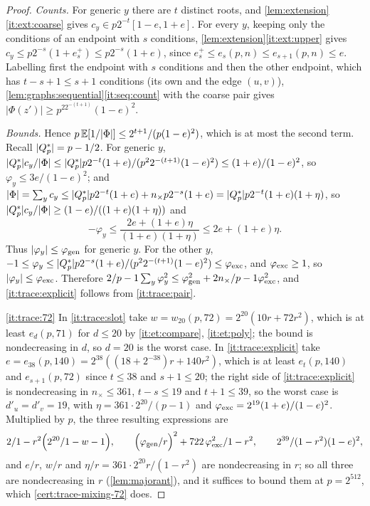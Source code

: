 \begin{proof}
\emph{Counts.} For generic $y$ there are $t$ distinct roots, and
\cref{lem:extension}\ref{it:ext:coarse} gives $c_y\in p2^{-t}[1-e,1+e]$. For every
$y$, keeping only the conditions of an endpoint with $s$ conditions,
\cref{lem:extension}\ref{it:ext:upper} gives $c_y\le p2^{-s}(1+e^+_s)\le p2^{-s}(1+e)$,
since $e^+_s\le e_s(p,n)\le e_{s+1}(p,n)\le e$. Labelling first the endpoint
with $s$ conditions and then the other endpoint, which has $t-s+1\le s+1$
conditions (its own and the edge $(u,v)$),
\cref{lem:graphs:sequential}\ref{it:seq:count} with the coarse pair gives
$|\Phi(z')|\ge p^22^{-(t+1)}(1-e)^2$.

\emph{Bounds.} Hence $p\,\E[1/|\Phi|]\le2^{t+1}/(p(1-e)^2)$, which is at most the
second term. Recall $|\Qsq|=\frac{p-1}2$. For generic $y$,
$|\Qsq|c_y/|\Phi|\le|\Qsq|p2^{-t}(1+e)/(p^22^{-(t+1)}(1-e)^2)\le(1+e)/(1-e)^2$, so
$\varphi_y\le3e/(1-e)^2$; and
$|\Phi|=\sum_yc_y\le|\Qsq|p2^{-t}(1+e)+n_\times p2^{-s}(1+e)=|\Qsq|p2^{-t}(1+e)(1+\eta)$,
so $|\Qsq|c_y/|\Phi|\ge(1-e)/((1+e)(1+\eta))$ and
\[
 -\varphi_y\le\frac{2e+(1+e)\eta}{(1+e)(1+\eta)}\le2e+(1+e)\eta .
\]
Thus $|\varphi_y|\le\varphi_{\rm gen}$ for generic $y$. For the other $y$,
$-1\le\varphi_y\le|\Qsq|p2^{-s}(1+e)/(p^22^{-(t+1)}(1-e)^2)\le\varphi_{\rm exc}$, and
$\varphi_{\rm exc}\ge1$, so $|\varphi_y|\le\varphi_{\rm exc}$. Therefore
$\frac2{p-1}\sum_y\varphi_y^2\le\varphi_{\rm gen}^2+\frac{2n_\times}{p-1}\varphi_{\rm exc}^2$,
and \ref{it:trace:explicit} follows from \ref{it:trace:pair}.

\ref{it:trace:72} In \ref{it:trace:slot} take $w=w_{20}(p,72)=2^{20}(10r+72r^2)$,
which is at least $e_d(p,71)$ for $d\le20$ by \ref{it:et:compare},
\ref{it:et:poly}; the bound is nondecreasing in $d$, so $d=20$ is the worst case.
In \ref{it:trace:explicit} take $e=e_{38}(p,140)=2^{38}((18+2^{-38})r+140r^2)$,
which is at least $e_t(p,140)$ and $e_{s+1}(p,72)$ since $t\le38$ and $s+1\le20$;
the right side of \ref{it:trace:explicit} is nondecreasing in $n_\times\le361$,
$t-s\le19$ and $t+1\le39$, so the worst case is $d'_u=d'_v=19$, with
$\eta=361\cdot2^{20}/(p-1)$ and $\varphi_{\rm exc}=2^{19}(1+e)/(1-e)^2$. Multiplied by
$p$, the three resulting expressions are
\[
 \frac2{1-r^2}\Bigl(\frac{2^{20}}{1-w}-1\Bigr),\qquad
 \Bigl(\frac{\varphi_{\rm gen}}r\Bigr)^2+\frac{722\,\varphi_{\rm exc}^2}{1-r^2},\qquad
 \frac{2^{39}}{(1-r^2)(1-e)^2},
\]
and $e/r$, $w/r$ and $\eta/r=361\cdot2^{20}r/(1-r^2)$ are nondecreasing in $r$; so
all three are nondecreasing in $r$ (\cref{lem:majorant}), and it suffices to
bound them at $p=2^{512}$, which \cref{cert:trace-mixing-72} does.
\end{proof}

